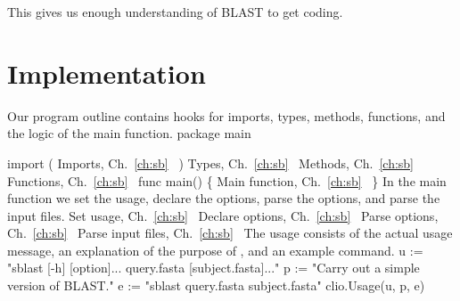This gives us enough understanding of BLAST to get coding.

\section*{Implementation}
Our program outline contains hooks for imports, types, methods,
functions, and the logic of the main function.
\nwenddocs{}\endmoddef\nwstartdeflinemarkup\nwenddeflinemarkup
package main

import (
          \LA{}Imports, Ch.~\ref{ch:sb}~{\nwtagstyle{}}\RA{}
)
\LA{}Types, Ch.~\ref{ch:sb}~{\nwtagstyle{}}\RA{}
\LA{}Methods, Ch.~\ref{ch:sb}~{\nwtagstyle{}}\RA{}
\LA{}Functions, Ch.~\ref{ch:sb}~{\nwtagstyle{}}\RA{}
func main() \{
          \LA{}Main function, Ch.~\ref{ch:sb}~{\nwtagstyle{}}\RA{}
\}
\nwendcode{}\nwdocspar
In the main function we set the usage, declare the options, parse the
options, and parse the input files.
\nwenddocs{}\endmoddef\nwstartdeflinemarkup{}\nwenddeflinemarkup
\LA{}Set usage, Ch.~\ref{ch:sb}~{\nwtagstyle{}}\RA{}
\LA{}Declare options, Ch.~\ref{ch:sb}~{\nwtagstyle{}}\RA{}
\LA{}Parse options, Ch.~\ref{ch:sb}~{\nwtagstyle{}}\RA{}
\LA{}Parse input files, Ch.~\ref{ch:sb}~{\nwtagstyle{}}\RA{}
\nwendcode{}\nwdocspar
The usage consists of the actual usage message, an explanation of the
purpose of , and an example command.
\nwenddocs{}\endmoddef\nwstartdeflinemarkup{}\nwenddeflinemarkup
u := "sblast [-h] [option]... query.fasta [subject.fasta]..."
p := "Carry out a simple version of BLAST."
e := "sblast query.fasta subject.fasta"
clio.Usage(u, p, e)
\nwendcode{}\nwdocspar
